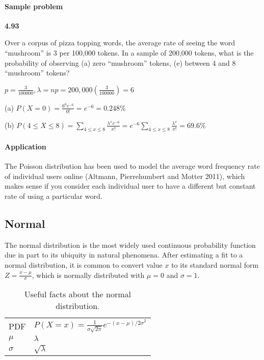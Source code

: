 \documentclass[11pt,letterpaper]{scrartcl}
\begin{document}
\paragraph{Sample problem}

\textbf{4.93}

Over a corpus of pizza topping words, the average rate of seeing the word ``mushroom'' is 3 per 100,000 tokens. 
In a sample of 200,000 tokens, what is the probability of observing (a) zero ``mushroom'' tokens, (e) between 4 and 8 ``mushroom'' tokens?

$p=\frac{3}{100000}, \lambda=np=200,000(\frac{3}{100000}) = 6$

(a) $P(X=0) = \frac{6^{0}e^{-6}}{0!} = e^{-6} = 0.248\%$

(b) $P(4 \leq X \leq 8) = \sum_{4 \leq x \leq 8} \frac{\lambda^{x}e^{-6}}{x!} = e^{-6} \sum_{4 \leq x \leq 8} \frac{\lambda^{x}}{x!} = 69.6\%$

\paragraph{Application}

The Poisson distribution has been used to model the average word frequency rate of individual users online (Altmann, Pierrehumbert and Motter 2011), which makes sense if you consider each individual user to have a different but constant rate of using a particular word.

\subsection{Normal}

The normal distribution is the most widely used continuous probability function due in part to its ubiquity in natural phenomena.
After estimating a fit to a normal distribution, it is common to convert value $x$ to its standard normal form $Z=\frac{x-\mu}{\sigma}$, which is normally distributed with $\mu=0$ and $\sigma=1$.

\begin{table}[h!]
\centering
\begin{tabular}{l l} \hline
PDF & $P(X=x)= \frac{1}{\sigma \sqrt{2\pi}} e^{-(x-\mu) / 2\sigma^{2}}$ \\
$\mu $ & $\lambda$ \\
$\sigma $ & $\sqrt{\lambda}$ \\ \hline
\end{tabular}
\caption{Useful facts about the normal distribution.}
\label{tab:normal}
\end{table}
\end{document}
